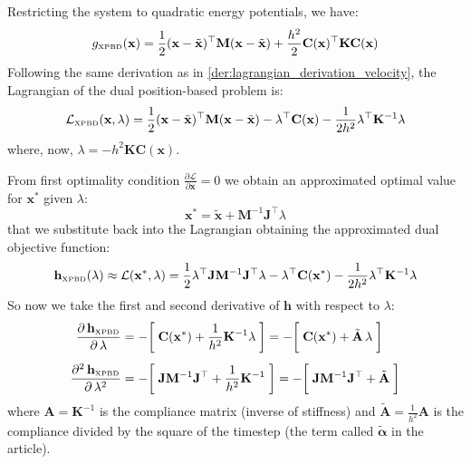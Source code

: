 \documentclass{article}
\newcommand{\pd}[2]{\dfrac{\partial\, #1}{\partial\, #2}}
\newcommand{\pdc}[2]{\frac{\partial #1}{\partial #2}}
\newcommand{\pdv}[2]{\dfrac{\partial^2\, #1}{\partial\, #2^2}}
\begin{document}
Restricting the system to quadratic energy potentials, we have:
\begin{equation}
g_{\text{\tiny XPBD}}(\mathbf{x}) = \frac{1}{2}(\mathbf{x} - \tilde{\mathbf{x}})^\top\mathbf{M}
    (\mathbf{x} - \tilde{\mathbf{x}}) + \frac{h^2}{2}\mathbf{C}(\mathbf{x})^\top
    \mathbf{K}\mathbf{C}(\mathbf{x})
\end{equation}
Following the same derivation as in \ref{der:lagrangian_derivation_velocity}, the Lagrangian of the dual position-based problem is:
\begin{equation}
\mathcal{L}_{\text{\tiny XPBD}}(\mathbf{x}, \lambda) = \frac{1}{2}(\mathbf{x} - \tilde{\mathbf{x}})^\top\mathbf{M}(\mathbf{x} - \tilde{\mathbf{x}}) - \lambda^\top\mathbf{C}(\mathbf{x}) - \frac{1}{2h^2}\lambda^\top\mathbf{K}^{-1}\lambda
\end{equation}
where, now,  $\lambda = -h^2\mathbf{K}\mathbf{C}(\mathbf{x})$.

\noindent From first optimality condition $\pdc{\mathcal{L}}{\mathbf{x}} = 0$ we obtain an approximated optimal value for $\mathbf{x}^*$ given $\lambda$:
\begin{equation}
\label{eq:XPBD:approx_optimal_position}
    \mathbf{x}^* = \tilde{\mathbf{x}} + \mathbf{M}^{-1}\mathbf{J}^\top\lambda
\end{equation}
that we substitute back into the Lagrangian obtaining the approximated dual objective function:
\begin{equation}
    \mathbf{h}_{\text{\tiny XPBD}}(\lambda) \approx \mathcal{L}(\mathbf{x}^*, \lambda) = \frac{1}{2}\lambda^\top\mathbf{J}\mathbf{M}^{-1}\mathbf{J}^\top\lambda -
    \lambda^\top\mathbf{C}(\mathbf{x}^*) -
    \frac{1}{2h^2}\lambda^\top\mathbf{K}^{-1}\lambda
\end{equation}
So now we take the first and second derivative of $\mathbf{h}$ with respect to $\lambda$:
\begin{equation}
\begin{aligned}
    \pd{\mathbf{h}_{\text{\tiny XPBD}}}{\lambda} 
    &= - \bigg[\; \mathbf{C}(\mathbf{x}^*) + \frac{1}{h^2}\mathbf{K}^{-1}\lambda\; \bigg]  
    = - \bigg[\; \mathbf{C}(\mathbf{x}^*) + \tilde{\mathbf{A}}\,\lambda\; \bigg] \\[1ex]
    \pdv{\mathbf{h}_{\text{\tiny XPBD}}}{\lambda} 
    &= - \bigg[\; \mathbf{J}\mathbf{M}^{-1}\mathbf{J}^\top + \frac{1}{h^2}\mathbf{K}^{-1} \; \bigg] 
    = - \bigg[\; \mathbf{J}\mathbf{M}^{-1}\mathbf{J}^\top + \tilde{\mathbf{A}} \; \bigg] 
\end{aligned}
\end{equation}
where $\mathbf{A} = \mathbf{K}^{-1}$ is the compliance matrix (inverse of stiffness) and $\tilde{\mathbf{A}} = \frac{1}{h^2}\mathbf{A}$ is the compliance divided by the square of the timestep (the term called $\tilde{\boldsymbol{\alpha}}$ in the article).
\end{document}
